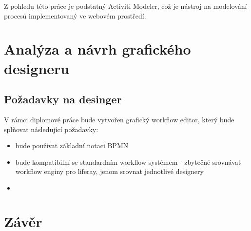 \documentclass{fithesis}
\begin{document}
Z pohledu této práce je podstatný Activiti Modeler, což je nástroj na modelování procesů implementovaný ve webovém prostředí.



\chapter{Analýza a návrh grafického designeru}
\section{Požadavky na desinger}

V rámci diplomové práce bude vytvořen grafický workflow editor, který bude splňovat následující požadavky:

\begin{itemize}
\item bude používat základní notaci BPMN
\item bude kompatibilní se standardním workflow systémem - zbytečné srovnávat workflow enginy pro liferay, jenom srovnat jednotlivé designery
\item
\end{itemize}





\chapter{Závěr}

\end{document}
